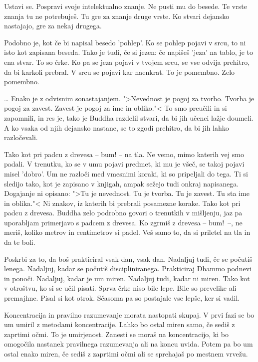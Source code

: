 
Ustavi se. Pospravi svoje intelektualno znanje. Ne pusti mu do besede. Te vrste znanja tu ne potrebuješ. Tu gre za znanje druge vrste. Ko stvari dejansko nastajajo, gre za nekaj drugega.

Podobno je, kot če bi napisal besedo 'pohlep'. Ko se pohlep pojavi v srcu, to ni isto kot zapisana beseda. Tako je tudi, če si jezen: če napišeš 'jeza' na tablo, je to ena stvar. To so črke. Ko pa se jeza pojavi v tvojem srcu, se vse odvija prehitro, da bi karkoli prebral. V srcu se pojavi kar naenkrat. To je pomembno. Zelo pomembno.

\clearpage


\ldots{} Enako je z odvisnim sonastajanjem. ">Nevednost je pogoj za tvorbo. Tvorba je pogoj za zavest. Zavest je pogoj za ime in obliko."< To smo preučili in si zapomnili, in res je, tako je Buddha razdelil stvari, da bi jih učenci lažje doumeli. A ko vsaka od njih dejansko nastane, se to zgodi prehitro, da bi jih lahko razločevali.

Tako kot pri padcu z drevesa – bum! – na tla. Ne vemo, mimo katerih vej smo padali. V trenutku, ko se v umu pojavi predmet, ki mu je všeč, se takoj pojavi misel 'dobro'. Um ne razloči med vmesnimi koraki, ki so pripeljali do tega. Ti si sledijo tako, kot je zapisano v knjigah, ampak sežejo tudi onkraj napisanega. Dogajanje ni opisano: ">Tu je nevednost. Tu je tvorba. Tu je zavest. Tu sta ime in oblika."< Ni znakov, iz katerih bi prebrali posamezne korake. Tako kot pri padcu z drevesa. Buddha zelo podrobno govori o trenutkih v mišljenju, jaz pa uporabljam primerjavo s padcem z drevesa. Ko zgrmiš z drevesa – bum! –, ne meriš, koliko metrov in centimetrov si padel. Veš samo to, da si priletel na tla in da te boli.

\clearpage


Poskrbi za to, da boš prakticiral vsak dan, vsak dan. Nadaljuj tudi, če se počutiš lenega. Nadaljuj, kadar se počutiš discipliniranega. Prakticiraj Dhammo podnevi in ponoči. Nadaljuj, kadar je um miren. Nadaljuj tudi, kadar ni miren. Tako kot v otroštvu, ko si se učil pisati. Sprva črke niso bile lepe. Bile so prevelike ali premajhne. Pisal si kot otrok. Sčasoma pa so postajale vse lepše, ker si vadil.


Koncentracija in pravilno razumevanje morata nastopati skupaj. V prvi fazi se bo um umiril z metodami koncentracije. Lahko bo ostal miren samo, če sediš z zaprtimi očmi. To je umirjenost. Zanesti se moraš na koncentracijo, ki bo omogočila nastanek pravilnega razumevanja ali na koncu uvida. Potem pa bo um ostal enako miren, če sediš z zaprtimi očmi ali se sprehajaš po mestnem vrvežu.

